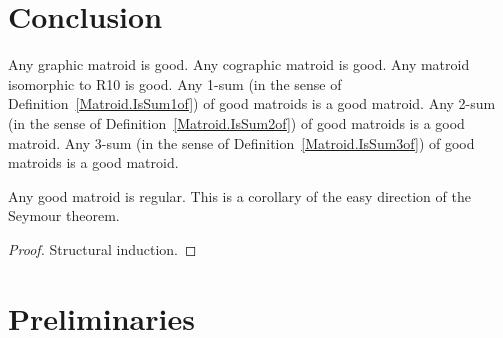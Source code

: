 
\chapter{Conclusion}

\begin{definition}
    \label{Matroid.IsGood}
    \leanok
    Any graphic matroid is good.
    Any cographic matroid is good.
    Any matroid isomorphic to R10 is good.
    Any 1-sum (in the sense of Definition~\ref{Matroid.IsSum1of}) of good matroids is a good matroid.
    Any 2-sum (in the sense of Definition~\ref{Matroid.IsSum2of}) of good matroids is a good matroid.
    Any 3-sum (in the sense of Definition~\ref{Matroid.IsSum3of}) of good matroids is a good matroid.
\end{definition}

\begin{corollary}
    \label{Matroid.IsGood.isRegular}
    \leanok
    Any good matroid is regular. This is a corollary of the easy direction of the Seymour theorem.
\end{corollary}

\begin{proof}
    Structural induction.
\end{proof}


%









\chapter{Preliminaries}

